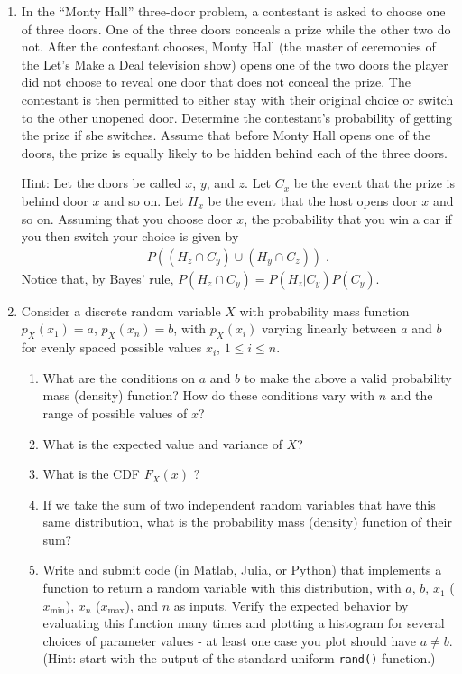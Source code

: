 \documentclass[letterpaper,12pt]{article}
\begin{document}
\begin{enumerate}
\item
In the ``Monty Hall'' three-door problem, a contestant is asked to choose one of three doors. One of the three doors conceals a prize while the other two do not. After the contestant chooses, Monty Hall (the master of ceremonies of the Let's Make a Deal television show) opens one of the two doors the player did not choose to reveal one door that does not conceal the prize. The contestant is then permitted to either stay with their original choice or switch to the other unopened door. Determine the contestant's probability of getting the prize if she switches. Assume that before Monty Hall opens one of the doors, the prize is equally likely to be hidden behind each of the three doors.

Hint: Let the doors be called $x$, $y$, and $z$. Let $C_x$ be the event that the prize is behind door $x$ and so on. Let $H_x$ be the event that the host opens door $x$ and so on. Assuming that you choose door $x$, the probability that you win a car if you then switch your choice is given by
\begin{align*}
    P((H_z \cap C_y) \cup (H_y \cap C_z)) \; .
\end{align*}
Notice that, by Bayes' rule, $P(H_z \cap C_y) = P(H_z|C_y) P(C_y)$.




\item
Consider a discrete random variable $X$ with probability mass function $p_X(x_1) = a$, $p_X(x_n) = b$, with $p_X(x_i)$ varying linearly between $a$ and $b$ for evenly spaced possible values $x_i$, $1 \leq i \leq n$.

\begin{enumerate}
\item What are the conditions on $a$ and $b$ to make the above a valid probability mass (density) function? How do these conditions vary with $n$ and the range of possible values of $x$?
\item What is the expected value and variance of $X$?
\item What is the CDF $F_X(x)$ ?
\item If we take the sum of two independent random variables that have this same distribution, what is the probability mass (density) function of their sum?
\item Write and submit code (in Matlab, Julia, or Python) that implements a function to return a random variable with this distribution, with $a$, $b$, $x_1$ ($x_{\min}$), $x_n$ ($x_{\max}$), and $n$ as inputs. Verify the expected behavior by evaluating this function many times and plotting a histogram for several choices of parameter values - at least one case you plot should have $a \neq b$. (Hint: start with the output of the standard uniform \texttt{rand()} function.)
\end{enumerate}


\end{enumerate}
\end{document}
